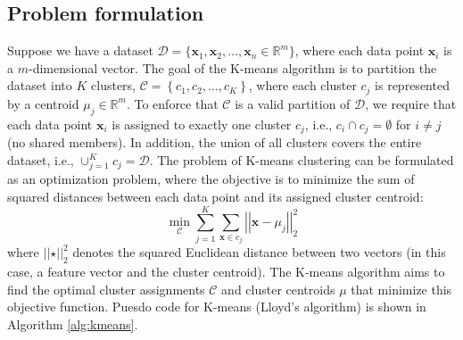 \documentclass{article}[11pt]
\newcommand{\norm}[1]{\left|\left|#1\right|\right|}
\begin{document}
\subsection{Problem formulation}
Suppose we have a dataset $\mathcal{D} = \{\mathbf{x}_1, \mathbf{x}_2, \ldots, \mathbf{x}_n\in\mathbb{R}^{m}\}$, where each data point $\mathbf{x}_i$ is a $m$-dimensional vector.
The goal of the K-means algorithm is to partition the dataset into $K$ clusters, $\mathcal{C} = \left\{c_{1},c_{2},\dots, c_{K}\right\}$, 
where each cluster $c_{j}$ is represented by a centroid $\mu_j\in\mathbb{R}^{m}$. To enforce that $\mathcal{C}$ is a valid partition of $\mathcal{D}$, we require that each data point $\mathbf{x}_i$ is assigned to exactly one cluster $c_{j}$, i.e., $c_{i}\cap c_{j} = \emptyset$ for $i\neq j$ (no shared members).
In addition, the union of all clusters covers the entire dataset, i.e., $\cup_{j=1}^{K}c_{j} = \mathcal{D}$.
The problem of K-means clustering can be formulated as an optimization problem, where the objective is to minimize the sum of squared distances between each data point and its assigned cluster centroid:
\begin{equation}
\min_{\mathcal{C}} \sum_{j=1}^{K}\sum_{\mathbf{x}\in c_{j}}\norm{\mathbf{x} - \mu_{j}}_{2}^{2}
\end{equation}
where $\norm{\star}_{2}^{2}$ denotes the squared Euclidean distance between two vectors (in this case, a feature vector and the cluster centroid). 
The K-means algorithm aims to find the optimal cluster assignments $\mathcal{C}$ and cluster centroids $\mu$ that minimize this objective function.
Puesdo code for K-means (Lloyd's algorithm) is shown in Algorithm \ref{alg:kmeans}.
\end{document}
